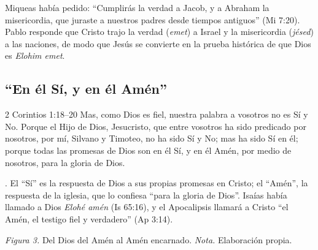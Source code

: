 Miqueas había pedido: ``Cumplirás la verdad a Jacob, y a Abraham la misericordia, que juraste a nuestros padres desde tiempos antiguos'' (Mi 7:20). Pablo responde que Cristo trajo la verdad (\emph{emet}) a Israel y la misericordia (\emph{jésed}) a las naciones, de modo que Jesús se convierte en la prueba histórica de que Dios es \emph{Elohim emet}.

\subsection{“En él Sí, y en él Amén”}
\begin{verso}{2 Corintios 1:18–20}
Mas, como Dios es fiel, nuestra palabra a vosotros no es Sí y No. Porque el Hijo de Dios, Jesucristo, que entre vosotros ha sido predicado por nosotros, por mí, Silvano y Timoteo, no ha sido Sí y No; mas ha sido Sí en él; porque todas las promesas de Dios son en él Sí, y en él Amén, por medio de nosotros, para la gloria de Dios.
\end{verso}

. El ``Sí'' es la respuesta de Dios a sus propias promesas en Cristo; el ``Amén'', la respuesta de la iglesia, que lo confiesa ``para la gloria de Dios''. Isaías había llamado a Dios \emph{Elohé amén} (Is 65:16), y el Apocalipsis llamará a Cristo ``el Amén, el testigo fiel y verdadero'' (Ap 3:14).

\begin{center}
\par
{\footnotesize\color{gris}\textit{Figura 3.} Del Dios del Amén al Amén encarnado. \textit{Nota.} Elaboración propia.}
\end{center}

